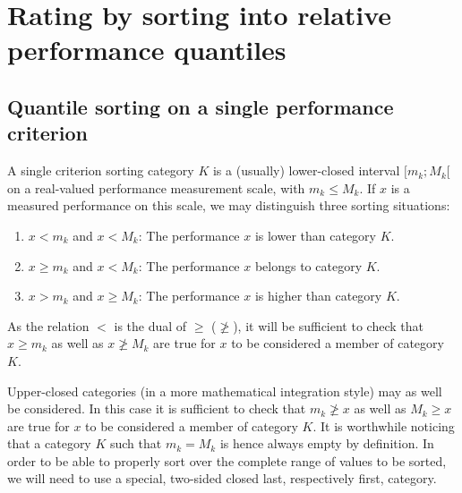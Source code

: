 \chapter{Rating by sorting into relative performance quantiles}
\label{sec:9}



\section{Quantile sorting on a single performance criterion}
\label{sec:9.1}

A single criterion sorting category $K$ is a (usually) lower-closed interval $[m_k ; M_k[$ on a real-valued performance measurement scale, with $m_k \leq M_k$. If $x$ is a measured performance on this scale, we may distinguish three sorting situations:
\begin{enumerate}[leftmargin=1cm,rightmargin=0.5cm,topsep=1pt]
\item $x < m_k$ and $x < M_k$: The performance $x$ is lower than category $K$.
\item $x \geqslant m_k$ and $x < M_k$: The performance $x$ belongs to category $K$.
\item $x > m_k$ and $x \geqslant M_k$: The performance $x$ is higher than category $K$.
\end{enumerate}

As the relation $<$ is the dual of $\geqslant$ ($\not\geqslant$), it will be sufficient to check that $x \geqslant m_k$ as well as $x \not\geqslant M_k$ are true for $x$ to be considered a member of category $K$.

Upper-closed categories (in a more mathematical integration style) may as well be considered. In this case it is sufficient to check that $m_k \not\geqslant x$ as well as $M_k \geqslant x$ are true for $x$ to be considered a member of category $K$. It is worthwhile noticing that a category $K$ such that $m_k = M_k$ is hence always empty by definition. In order to be able to properly sort over the complete range of values to be sorted, we will need to use a special, two-sided closed last, respectively first, category.


